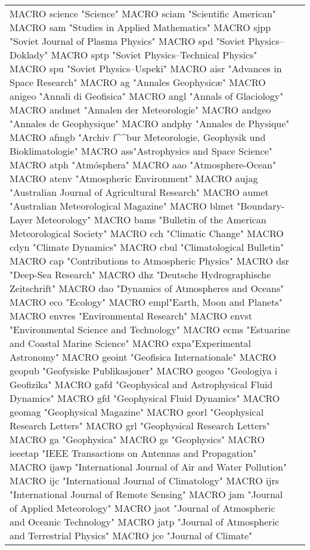 \documentclass{article}
\begin{document}
\begin{longtable}{lp{6cm}}
MACRO {science} {"Science"}
MACRO {sciam} {"Scientific American"}
MACRO {sam} {"Studies in Applied Mathematics"}
MACRO {sjpp} {"Soviet Journal of Plasma Physics"}
MACRO {spd} {"Soviet Physics--Doklady"}
MACRO {sptp} {"Soviet Physics--Technical Physics"}
MACRO {spu} {"Soviet Physics--Uspeki"}
MACRO {aisr} {"Advances in Space Research"}
MACRO {ag} {"Annales Geophysic\ae"}
MACRO {anigeo} {"Annali di Geofisica"}
MACRO {angl} {"Annals of Glaciology"}
MACRO {andmet} {"Annalen der Meteorologie"}
MACRO {andgeo} {"Annales de Geophysique"}
MACRO {andphy} {"Annales de Physique"}
MACRO {afmgb} {"Archiv f\^^b{u}r Meteorologie, Geophysik und Bioklimatologie"}
MACRO {ass}{"Astrophysics and Space Science"}
MACRO {atph} {"Atm\'osphera"}
MACRO {aao} {"Atmosphere-Ocean"}
MACRO {atenv} {"Atmospheric Environment"}
MACRO {aujag} {"Australian Journal of Agricultural Research"}
MACRO {aumet} {"Australian Meteorological Magazine"}
MACRO {blmet} {"Boundary-Layer Meteorology"}
MACRO {bams} {"Bulletin of the American Meteorological Society"}
MACRO {cch} {"Climatic Change"}
MACRO {cdyn} {"Climate Dynamics"}
MACRO {cbul} {"Climatological Bulletin"}
MACRO {cap} {"Contributions to Atmospheric Physics"}
MACRO {dsr} {"Deep-Sea Research"}
MACRO {dhz} {"Deutsche Hydrographische Zeitschrift"}
MACRO {dao} {"Dynamics of Atmospheres and Oceans"}
MACRO {eco} {"Ecology"}
MACRO {empl}{"Earth, Moon and Planets"}
MACRO {envres} {"Environmental Research"}
MACRO {envst} {"Environmental Science and Technology"}
MACRO {ecms} {"Estuarine and Coastal Marine Science"}
MACRO {expa}{"Experimental Astronomy"}
MACRO {geoint} {"Geofisica Internationale"}
MACRO {geopub} {"Geofysiske Publikasjoner"}
MACRO {geogeo} {"Geologiya i Geofizika"}
MACRO {gafd} {"Geophysical and Astrophysical Fluid Dynamics"}
MACRO {gfd} {"Geophysical Fluid Dynamics"}
MACRO {geomag} {"Geophysical Magazine"}
MACRO {georl} {"Geophysical Research Letters"}
MACRO {grl} {"Geophysical Research Letters"}
MACRO {ga} {"Geophysica"}
MACRO {gs} {"Geophysics"}
MACRO {ieeetap} {"IEEE Transactions on Antennas and Propagation"}
MACRO {ijawp} {"International Journal of Air and Water Pollution"}
MACRO {ijc} {"International Journal of Climatology"}
MACRO {ijrs} {"International Journal of Remote Sensing"}
MACRO {jam} {"Journal of Applied Meteorology"}
MACRO {jaot} {"Journal of Atmospheric and Oceanic Technology"}
MACRO {jatp} {"Journal of Atmospheric and Terrestrial Physics"}
MACRO {jce} {"Journal of Climate"}

\end{longtable}
\end{document}
